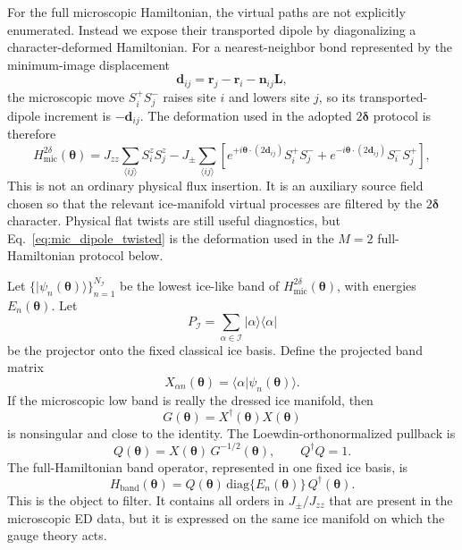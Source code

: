 \documentclass[11pt,letterpaper]{article}
\newcommand{\Jzz}{J_{zz}}
\newcommand{\Jpm}{J_{\pm}}
\newcommand{\bd}{\bm d}
\newcommand{\bn}{\bm n}
\newcommand{\bL}{\bm L}
\newcommand{\br}{\bm r}
\newcommand{\bdelta}{\bm \delta}
\newcommand{\btheta}{\bm \theta}
\newcommand{\ice}{\mathcal I}
\newcommand{\HB}{H_{\mathrm{band}}}
\newcommand{\Hmic}{H_{\mathrm{mic}}}
\theoremstyle{plain}
\theoremstyle{definition}
\begin{document}
For the full microscopic Hamiltonian, the virtual paths are not explicitly
enumerated.  Instead we expose their transported dipole by diagonalizing a
character-deformed Hamiltonian.  For a nearest-neighbor bond represented by
the minimum-image displacement
\[
\bd_{ij}=\br_j-\br_i-\bn_{ij}\bL,
\]
the microscopic move $S_i^+S_j^-$ raises site $i$ and lowers site $j$, so its
transported-dipole increment is $-\bd_{ij}$.  The deformation used in the
adopted $2\bdelta$ protocol is therefore
\begin{equation}
\Hmic^{2\delta}(\btheta)=
\Jzz\sum_{\langle ij\rangle}S_i^zS_j^z
-\Jpm\sum_{\langle ij\rangle}
\left[
e^{+i\btheta\cdot(2\bd_{ij})}S_i^+S_j^-
+e^{-i\btheta\cdot(2\bd_{ij})}S_i^-S_j^+
\right],
\label{eq:mic_dipole_twisted}
\end{equation}
This is not an ordinary physical flux insertion.  It is an auxiliary source
field chosen so that the relevant ice-manifold virtual processes are filtered
by the $2\bdelta$ character.  Physical flat twists are still useful
diagnostics, but Eq.~\eqref{eq:mic_dipole_twisted} is the deformation used in
the $M=2$ full-Hamiltonian protocol below.

Let $\{|\psi_n(\btheta)\rangle\}_{n=1}^{N_{\ice}}$ be the lowest ice-like band
of $\Hmic^{2\delta}(\btheta)$, with energies $E_n(\btheta)$.  Let
\[
P_{\ice}=\sum_{\alpha\in\ice}|\alpha\rangle\langle\alpha|
\]
be the projector onto the fixed classical ice basis.  Define the projected
band matrix
\begin{equation}
X_{\alpha n}(\btheta)=\langle\alpha|\psi_n(\btheta)\rangle .
\end{equation}
If the microscopic low band is really the dressed ice manifold, then
\begin{equation}
G(\btheta)=X^\dagger(\btheta)X(\btheta)
\end{equation}
is nonsingular and close to the identity.  The Loewdin-orthonormalized pullback
is
\begin{equation}
Q(\btheta)=X(\btheta)\,G^{-1/2}(\btheta),
\qquad Q^\dagger Q=1.
\label{eq:lowdin_pullback}
\end{equation}
The full-Hamiltonian band operator, represented in one fixed ice basis, is
\begin{equation}
\HB(\btheta)=
Q(\btheta)\,\mathrm{diag}\{E_n(\btheta)\}\,Q^\dagger(\btheta).
\label{eq:band_operator}
\end{equation}
This is the object to filter.  It contains all orders in $\Jpm/\Jzz$ that are
present in the microscopic ED data, but it is expressed on the same ice
manifold on which the gauge theory acts.
\end{document}
